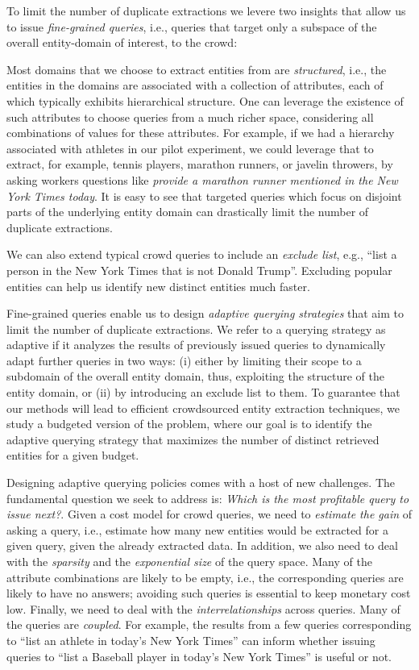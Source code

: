  To limit the number of duplicate extractions we levere two insights that allow us to issue {\em fine-grained queries}, i.e., queries that target only a subspace of the overall entity-domain of interest, to the crowd:

Most domains that we choose to extract entities from are {\em structured}, i.e., the entities in the domains are associated with a collection of attributes, each of which typically exhibits hierarchical structure. One can leverage the existence of such attributes to choose queries from a much richer space, considering all combinations of values for these attributes. For example, if we had a hierarchy associated with athletes in our pilot experiment, we could leverage that to extract, for example, tennis players, marathon runners, or javelin throwers, by asking workers questions like {\em provide a marathon runner mentioned in the New York Times today}. It is easy to see that targeted queries which focus on disjoint parts of the underlying entity domain can drastically limit the number of duplicate extractions.

We can also extend typical crowd queries to include an {\em exclude list}, e.g., ``list a person in the New York Times that is not Donald Trump''.  Excluding popular entities can help us identify new distinct entities much faster.

Fine-grained queries enable us to design {\em adaptive querying strategies} that aim to limit the number of duplicate extractions. We refer to a querying strategy as adaptive if it analyzes the results of previously issued queries to dynamically adapt further queries in two ways: (i) either by limiting their scope to a subdomain of the overall entity domain, thus, exploiting the structure of the entity domain, or (ii) by introducing an exclude list to them. To guarantee that our methods will lead to efficient crowdsourced entity extraction techniques, we study a budgeted version of the problem, where our goal is to identify the adaptive querying strategy that maximizes the number of distinct retrieved entities for a given budget.

Designing adaptive querying policies comes with a host of new challenges. The fundamental question we seek to address is: {\em Which is the most profitable query to issue next?}. Given a cost model for crowd queries, we need to {\em estimate the gain} of asking a query, i.e., estimate how many new entities would be extracted for a given query, given the already extracted data. In addition, we also need to deal with the {\em sparsity} and the {\em exponential size} of the query space. Many of the attribute combinations are likely to be empty, i.e., the corresponding queries are likely to have no answers; avoiding such queries is essential to keep monetary cost low. Finally, we need to deal with the {\em interrelationships} across queries. Many of the queries are {\em coupled}. For example, the results from a few queries corresponding to ``list an athlete in today's New York Times'' can inform whether issuing queries to ``list a Baseball player in today's New York Times'' is useful or not. 

